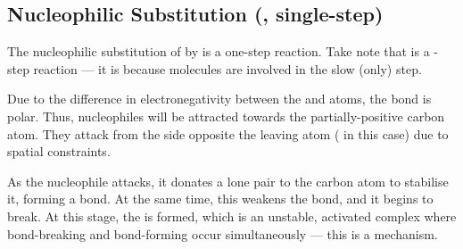 		\pagebreak
		\subsection{Nucleophilic Substitution (\sntwo{}, single-step)}

			The nucleophilic substitution of  by  is a one-step reaction. Take note that \sntwo{} is a
			-step reaction --- it is \sntwo{} because  molecules are involved in the slow (only) step.



			Due to the difference in electronegativity between the  and  atoms, the  bond is polar. Thus,
			nucleophiles will be attracted towards the partially-positive carbon atom. They attack from the side opposite the
			leaving atom ( in this case) due to spatial constraints.

			As the nucleophile attacks, it donates a lone pair to the carbon atom to stabilise it, forming a bond. At the same time, this
			weakens the  bond, and it begins to break. At this stage, the  is formed, which is an
			unstable, activated complex where bond-breaking and bond-forming occur simultaneously --- this is a  mechanism.

